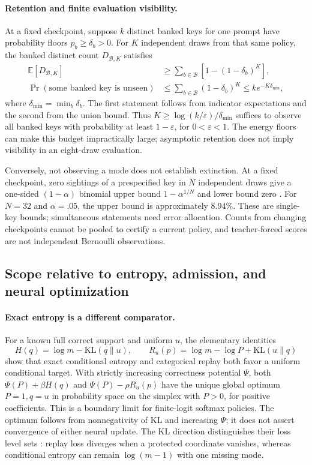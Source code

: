 \documentclass{article}
\newcommand{\1}{\mathbf 1}
\theoremstyle{remark}
\theoremstyle{definition}
\theoremstyle{plain}
\begin{document}
\paragraph{Retention and finite evaluation visibility.}
At a fixed checkpoint, suppose $k$ distinct banked keys for one prompt have
probability floors $p_b\ge\delta_b>0$. For $K$ independent draws from that
same policy, the banked distinct count $D_{\mathcal B,K}$ satisfies
\[
 \begin{aligned}
 \mathbb E[D_{\mathcal B,K}]
 &\ge\sum_{b\in\mathcal B}\left[1-(1-\delta_b)^K\right],\\
 \Pr(\text{some banked key is unseen})
 &\le\sum_{b\in\mathcal B}(1-\delta_b)^K
 \le k e^{-K\delta_{\min}},
 \end{aligned}
\]
where $\delta_{\min}=\min_b\delta_b$. The first statement follows from
indicator expectations and the second from the union bound. Thus
$K\ge\log(k/\varepsilon)/\delta_{\min}$ suffices to observe all banked keys
with probability at least $1-\varepsilon$, for $0<\varepsilon<1$.
The energy floors can make this budget impractically large; asymptotic
retention does not imply visibility in an eight-draw evaluation.

Conversely, not observing a mode does not establish extinction. At a fixed
checkpoint, zero sightings of a prespecified key in $N$ independent draws
give a one-sided $(1-\alpha)$ binomial upper bound
$1-\alpha^{1/N}$ and lower bound zero \citep{clopper1934binomial}. For
$N=32$ and $\alpha=.05$, the upper bound is approximately $8.94\%$.
These are single-key bounds; simultaneous statements need error allocation.
Counts from changing checkpoints cannot be pooled to certify a current
policy, and teacher-forced scores are not independent Bernoulli observations.

\subsection{Scope relative to entropy, admission, and neural optimization}
\label{app:theory-entropy}
\label{app:theory-entropy-comparison}

\paragraph{Exact entropy is a different comparator.}
For a known full correct support and uniform $u$, the elementary identities
\[
 H(q)=\log m-\mathrm{KL}(q\|u),\qquad
 R_u(p)=\log m-\log P+\mathrm{KL}(u\|q)
\]
show that exact conditional entropy and categorical replay both favor a
uniform conditional target. With strictly increasing correctness potential
$\Psi$, both $\Psi(P)+\beta H(q)$ and $\Psi(P)-\rho R_u(p)$ have the unique
global optimum $P=1,q=u$ in probability space on the simplex with $P>0$,
for positive coefficients. This is a boundary limit for finite-logit softmax
policies. The optimum follows from nonnegativity of KL and increasing
$\Psi$; it does not assert convergence of either neural update. The KL direction distinguishes their
loss level sets \citep{pereyra2017confidencepenalty,agarwal2021policygradient}:
replay loss diverges when a protected coordinate vanishes, whereas
conditional entropy can remain $\log(m-1)$ with one missing mode.
\end{document}
